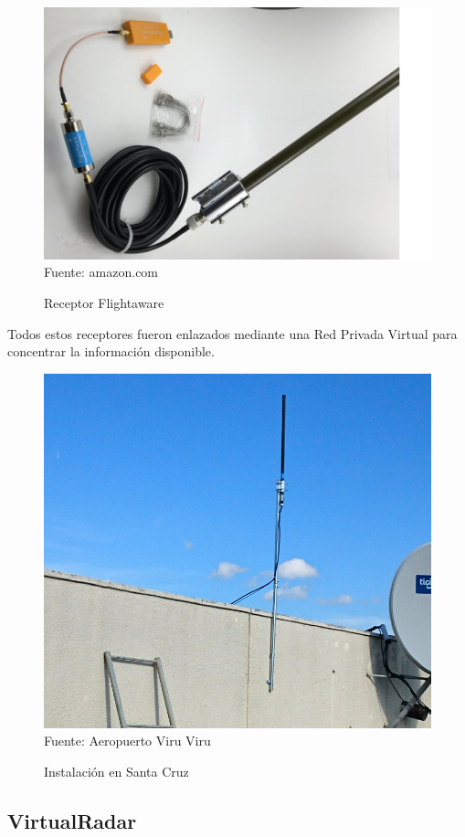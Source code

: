 \documentclass[fleqn,10pt]{SelfArx} %
\begin{document}
\begin{figure}[ht]
\caption{Receptor Flightaware}
\centering
\includegraphics[width=0.9\linewidth]{flightaware.jpg}
\newline Fuente: amazon.com
\label{fig:flighaware}
\end{figure}

Todos estos receptores fueron enlazados mediante una Red Privada Virtual para concentrar la información disponible.

\begin{figure}[ht]
\caption{Instalación en Santa Cruz}
\centering
\includegraphics[width=0.8\linewidth]{antena_scz.jpg}
\newline Fuente: Aeropuerto Viru Viru
\label{fig:antena_vvi}
\end{figure}

\subsection*{VirtualRadar}
\end{document}

